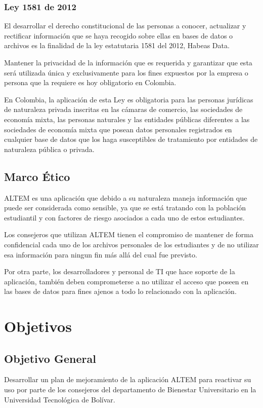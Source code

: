 \subsubsection{ Ley 1581 de 2012 }
El desarrollar el derecho constitucional de las personas a conocer, actualizar y rectificar información que se haya recogido sobre ellas en bases de datos o archivos es la finalidad de la ley estatutaria 1581 del 2012, Habeas Data.\cite{hadata}

Mantener la privacidad de la información que es requerida y garantizar que esta será utilizada única y exclusivamente para los fines expuestos por la empresa o persona que la requiere es hoy obligatorio en Colombia.\cite{hadata}

En Colombia, la aplicación de esta Ley es obligatoria para las personas jurídicas de naturaleza privada inscritas en las cámaras de comercio, las sociedades de economía mixta, las personas naturales y las entidades públicas diferentes a las sociedades de economía mixta que posean datos personales registrados en cualquier base de datos que los haga susceptibles de tratamiento por entidades de naturaleza pública o privada.\cite{hadata}

\subsection{Marco Ético}
ALTEM es una aplicación que debido a su naturaleza maneja información que puede ser considerada como sensible, ya que se está tratando con la población estudiantil y con factores de riesgo asociados a cada uno de estos estudiantes. 

Los consejeros que utilizan ALTEM tienen el compromiso de mantener de forma confidencial cada uno de los archivos personales de los estudiantes y de no utilizar esa información para ningun fin más allá del cual fue previsto.

Por otra parte, los desarrolladores y personal de TI que hace soporte de la aplicación, también deben comprometerse a no utilizar el acceso que poseen en las bases de datos para fines ajenos a todo lo relacionado con la aplicación.
\section{Objetivos}

\subsection{Objetivo General}
Desarrollar un plan de mejoramiento de la aplicación ALTEM para reactivar su uso por parte de los consejeros del departamento de Bienestar Universitario en la Universidad Tecnológica de Bolívar.

